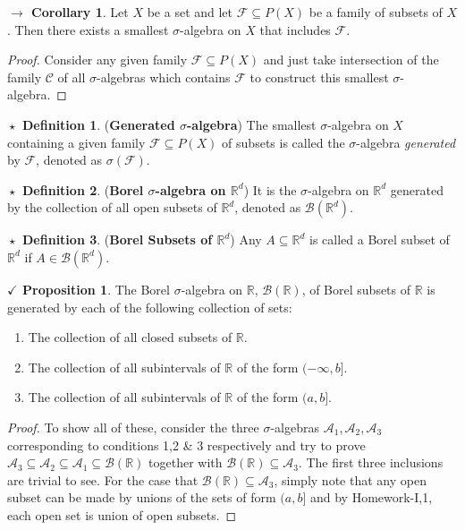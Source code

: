 \documentclass{article}
\theoremstyle{definition}
\newtheorem{definition}{$\boxed{\star}$ Definition}
\theoremstyle{remark}
\theoremstyle{definition}
\newtheorem{corollary}{$ \to $ Corollary}
\theoremstyle{definition}
\newtheorem{proposition}{$\checkmark$ Proposition}
\theoremstyle{definition}
\newcommand{\R}{\mathbb{R}}
\newcommand{\alg}[1]{\mathscr{#1}}
\newcommand{\bor}[1]{\mathscr{B}(#1)}
\begin{document}
\begin{corollary}
	Let $ X $ be a set and let $ \alg{F}\subseteq P(X) $ be a family of subsets of $ X $. Then there exists a smallest $ \sigma $-algebra on $ X $ that includes $ \alg{F} $.
\end{corollary}
\begin{proof}
	Consider any given family $ \alg{F} \subseteq P(X)$ and just take intersection of the family $ \alg{C} $ of all $ \sigma $-algebras which contains $ \alg{F} $ to construct this smallest $ \sigma $-algebra. 
\end{proof}
\hrulefill
\begin{definition}
	(\textbf{Generated $ \sigma $-algebra}) The smallest $ \sigma $-algebra on $ X $ containing a given family $ \alg{F}  \subseteq P(X) $ of subsets is called the $ \sigma $-algebra \emph{generated} by $ \alg{F} $, denoted as $ \sigma(\alg{F}) $.
\end{definition}
\hrulefill
\begin{definition}
	(\textbf{Borel $ \sigma $-algebra on $ \R^d $}) It is the $ \sigma $-algebra on $ \R^d $ generated by the collection of all open subsets of $ \R^d $, denoted as $ \alg{B}(\R^d) $.
\end{definition}
\hrulefill
\begin{definition}
	(\textbf{Borel Subsets of $ \R^d $}) Any $ A \subseteq \R^d$ is called a Borel subset of $ \R^d $ if $ A\in \bor{\R^d} $.
\end{definition}
\hrulefill
\newpage
\begin{proposition}
	\label{P-2}
	The Borel $ \sigma $-algebra on $ \R $, $ \bor{\R} $, of Borel subsets of $ \R $ is  generated by each of the following collection of sets:
	\begin{enumerate}
		\item {The collection of all closed subsets of $ \R $.}
		\item {The collection of all subintervals of $ \R $ of the form $ (-\infty,b] $.}
		\item {The collection of all subintervals of $ \R $ of the form $ (a,b] $.}
	\end{enumerate}
\end{proposition}
\begin{proof}
	To show all of these, consider the three $\sigma$-algebras $ \alg{A}_1, \alg{A}_2, \alg{A}_3 $ corresponding to conditions 1,2 \& 3 respectively and try to prove $ \alg{A}_3\subseteq \alg{A}_2\subseteq \alg{A}_1 \subseteq \bor{\R}$ together with $ \bor{\R}\subseteq \alg{A}_3 $. The first three inclusions are trivial to see. For the case that $ \bor{\R}\subseteq \alg{A}_3 $, simply note that any open subset can be made by unions of the sets of form $ (a,b] $ and by Homework-I,1, each open set is union of open subsets.
\end{proof}
\end{document}

